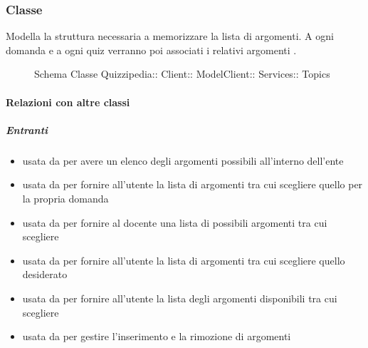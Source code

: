 \subsubsection{Classe }
Modella la struttura necessaria a memorizzare la lista di argomenti. A ogni domanda e a ogni quiz verranno poi associati i relativi argomenti .
\begin{figure}[H]
\centering
\noindent{}
\caption[Schema Classe Topics]{Schema Classe Quizzipedia:: Client:: ModelClient:: Services:: Topics}
\end{figure}
\paragraph{Relazioni con altre classi}
\subparagraph{Entranti}
\begin{itemize}
\item usata da  per avere un elenco degli argomenti possibili all'interno dell'ente
\item usata da  per fornire all'utente la lista di argomenti tra cui scegliere quello per la propria domanda
\item usata da  per fornire al docente una lista di possibili argomenti tra cui scegliere
\item usata da  per fornire all'utente la lista di argomenti tra cui scegliere quello desiderato
\item usata da  per fornire all'utente la lista degli argomenti disponibili tra cui scegliere
\item usata da  per gestire l'inserimento e la rimozione di argomenti
\end{itemize}
